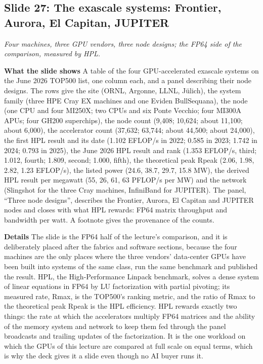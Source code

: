 \documentclass[11pt,letterpaper]{article}
\newcommand{\slide}[3]{%
  \subsection[Slide #1: #2]{Slide #1: #2}%
  {\color{muted}\itshape #3\par}\medskip}
\newcommand{\para}[1]{\medskip\noindent\textbf{#1}\quad}
\begin{document}
\slide{27}{The exascale systems: Frontier, Aurora, El Capitan, JUPITER}{Four machines, three GPU vendors, three node designs; the FP64 side of the comparison, measured by HPL.}

\para{What the slide shows} A table of the four GPU-accelerated exascale systems on the June 2026 TOP500 list, one column each, and a panel describing their node designs. The rows give the site (ORNL, Argonne, LLNL, J\"ulich), the system family (three HPE Cray EX machines and one Eviden BullSequana), the node (one CPU and four MI250X; two CPUs and six Ponte Vecchio; four MI300A APUs; four GH200 superchips), the node count (9,408; 10,624; about 11,100; about 6,000), the accelerator count (37,632; 63,744; about 44,500; about 24,000), the first HPL result and its date (1.102 EFLOP/s in 2022; 0.585 in 2023; 1.742 in 2024; 0.793 in 2025), the June 2026 HPL result and rank (1.353 EFLOP/s, third; 1.012, fourth; 1.809, second; 1.000, fifth), the theoretical peak Rpeak (2.06, 1.98, 2.82, 1.23 EFLOP/s), the listed power (24.6, 38.7, 29.7, 15.8 MW), the derived HPL result per megawatt (55, 26, 61, 63 PFLOP/s per MW) and the network (Slingshot for the three Cray machines, InfiniBand for JUPITER). The panel, ``Three node designs'', describes the Frontier, Aurora, El Capitan and JUPITER nodes and closes with what HPL rewards: FP64 matrix throughput and bandwidth per watt. A footnote gives the provenance of the counts.

\para{Details} The slide is the FP64 half of the lecture's comparison, and it is deliberately placed after the fabrics and software sections, because the four machines are the only places where the three vendors' data-center GPUs have been built into systems of the same class, run the same benchmark and published the result. HPL, the High-Performance Linpack benchmark, solves a dense system of linear equations in FP64 by LU factorization with partial pivoting; its measured rate, Rmax, is the TOP500's ranking metric, and the ratio of Rmax to the theoretical peak Rpeak is the HPL efficiency. HPL rewards exactly two things: the rate at which the accelerators multiply FP64 matrices and the ability of the memory system and network to keep them fed through the panel broadcasts and trailing updates of the factorization. It is the one workload on which the GPUs of this lecture are compared at full scale on equal terms, which is why the deck gives it a slide even though no AI buyer runs it.
\end{document}
